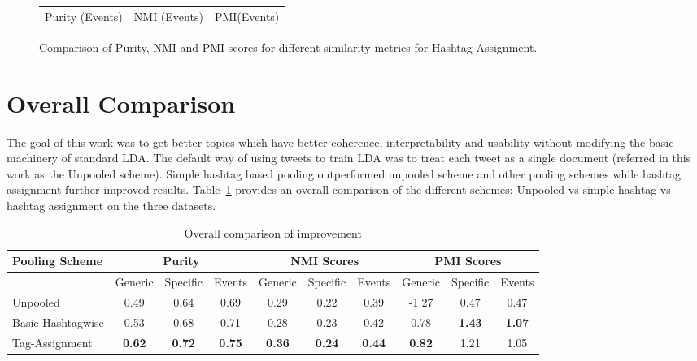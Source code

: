 \documentclass[10pt,a5paper,twoside]{article}
\begin{document}
\begin{figure}[t!]
\begin{center}
{\begin{tabular}{ccc}
		

		{\Large Purity (Events)} & {\Large NMI (Events)} & 
		{\Large PMI(Events)}\\

	
	\end{tabular}
}
\end{center}
\vspace{-4mm}
\caption{\footnotesize Comparison of Purity, NMI and PMI scores for different similarity metrics for Hashtag Assignment.} \label{fig-1}
\end{figure}




\section{Overall Comparison}
The goal of this work was to get better topics which have better coherence, interpretability and usability without modifying the basic machinery of standard LDA. The default way of using tweets to train LDA was to treat each tweet as a single document (referred in this work as the Unpooled scheme). Simple hashtag based pooling outperformed unpooled scheme and other pooling schemes while hashtag assignment further improved results. Table~\ref{tbl-10} provides an overall comparison of the different schemes: Unpooled vs simple hashtag vs hashtag assignment on the three datasets.

\begin{table}[!h]
\centering
\resizebox{14cm}{!} 
{
	\begin{tabular}{|l|ccc|ccc|ccc|}
	\hline
	Pooling Scheme  & \multicolumn {3}{c}{Purity} & \multicolumn {3}{c}{NMI Scores} & \multicolumn {3}{c|}{PMI Scores}\\
	\hline
	 & Generic & Specific & Events &  Generic & Specific & Events &  Generic & Specific & Events\\
	\hline
	Unpooled & 0.49 & 0.64 & 0.69 & 0.29 & 0.22 & 0.39 & -1.27 & 0.47 & 0.47 \\
	\hline
	Basic Hashtagwise & 0.53 & 0.68 & 0.71 & 0.28 & 0.23 & 0.42 & 0.78 & \textbf{1.43} & \textbf{1.07} \\
	\hline
	Tag-Assignment & \textbf{0.62} & \textbf{0.72} & \textbf{0.75} & \textbf{0.36} & \textbf{0.24} & \textbf{0.44} & \textbf{0.82} & 1.21 & 1.05 \\
	\hline
	\end{tabular}
}
\caption{Overall comparison of improvement}\label{tbl-10}
\end{table}
\end{document}
